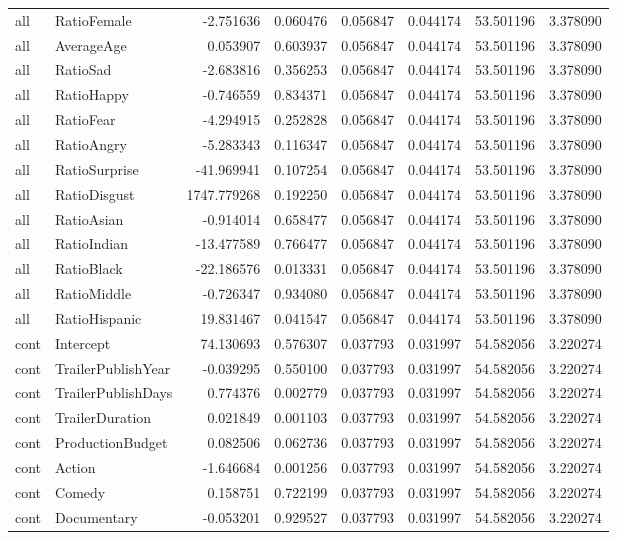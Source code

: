 \begin{tabular}{llrrrrrr}
all & RatioFemale & -2.751636 & 0.060476 & 0.056847 & 0.044174 & 53.501196 & 3.378090 \\
all & AverageAge & 0.053907 & 0.603937 & 0.056847 & 0.044174 & 53.501196 & 3.378090 \\
all & RatioSad & -2.683816 & 0.356253 & 0.056847 & 0.044174 & 53.501196 & 3.378090 \\
all & RatioHappy & -0.746559 & 0.834371 & 0.056847 & 0.044174 & 53.501196 & 3.378090 \\
all & RatioFear & -4.294915 & 0.252828 & 0.056847 & 0.044174 & 53.501196 & 3.378090 \\
all & RatioAngry & -5.283343 & 0.116347 & 0.056847 & 0.044174 & 53.501196 & 3.378090 \\
all & RatioSurprise & -41.969941 & 0.107254 & 0.056847 & 0.044174 & 53.501196 & 3.378090 \\
all & RatioDisgust & 1747.779268 & 0.192250 & 0.056847 & 0.044174 & 53.501196 & 3.378090 \\
all & RatioAsian & -0.914014 & 0.658477 & 0.056847 & 0.044174 & 53.501196 & 3.378090 \\
all & RatioIndian & -13.477589 & 0.766477 & 0.056847 & 0.044174 & 53.501196 & 3.378090 \\
all & RatioBlack & -22.186576 & 0.013331 & 0.056847 & 0.044174 & 53.501196 & 3.378090 \\
all & RatioMiddle & -0.726347 & 0.934080 & 0.056847 & 0.044174 & 53.501196 & 3.378090 \\
all & RatioHispanic & 19.831467 & 0.041547 & 0.056847 & 0.044174 & 53.501196 & 3.378090 \\
cont & Intercept & 74.130693 & 0.576307 & 0.037793 & 0.031997 & 54.582056 & 3.220274 \\
cont & TrailerPublishYear & -0.039295 & 0.550100 & 0.037793 & 0.031997 & 54.582056 & 3.220274 \\
cont & TrailerPublishDays & 0.774376 & 0.002779 & 0.037793 & 0.031997 & 54.582056 & 3.220274 \\
cont & TrailerDuration & 0.021849 & 0.001103 & 0.037793 & 0.031997 & 54.582056 & 3.220274 \\
cont & ProductionBudget & 0.082506 & 0.062736 & 0.037793 & 0.031997 & 54.582056 & 3.220274 \\
cont & Action & -1.646684 & 0.001256 & 0.037793 & 0.031997 & 54.582056 & 3.220274 \\
cont & Comedy & 0.158751 & 0.722199 & 0.037793 & 0.031997 & 54.582056 & 3.220274 \\
cont & Documentary & -0.053201 & 0.929527 & 0.037793 & 0.031997 & 54.582056 & 3.220274 \\

\end{tabular}
